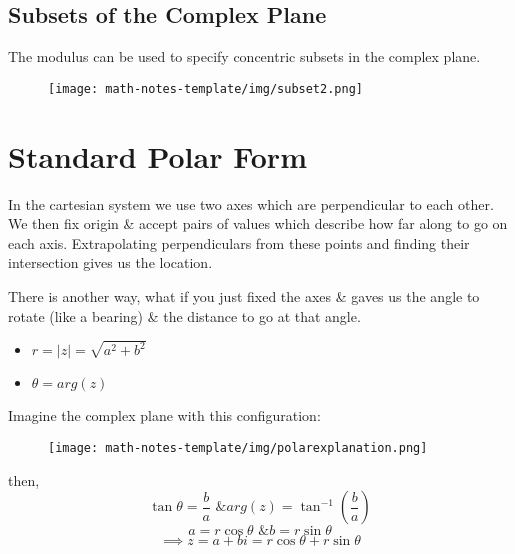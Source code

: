 \documentclass[oneside]{book}
\begin{document}



\subsection*{Subsets of the Complex Plane}

The modulus can be used to specify concentric subsets in the complex plane.


\begin{figure}[H]
    \centering
    \texttt{[image: math-notes-template/img/subset2.png]}
    \label{fig:enter-label}
\end{figure}

\section*{Standard Polar Form}
In the cartesian system we use two axes which are perpendicular to each other. We then fix origin \& accept pairs of values which describe how far along to go on each axis. Extrapolating perpendiculars from these points and finding their intersection gives us the location.\newline

There is another way, what if you just fixed the axes \& gaves us the angle to rotate (like a bearing) \& the distance to go at that angle.
\begin{itemize}
    \item $r = |z| = \sqrt{a^2 + b^2}$
    \item $\theta = arg(z)$
\end{itemize}
Imagine the complex plane with this configuration:
\begin{figure}[H]
    \centering
    \texttt{[image: math-notes-template/img/polarexplanation.png]}
    \label{fig:enter-label}
\end{figure}
then,
\[
\tan{\theta} = \frac{b}{a} \text{ \& } arg(z) = \tan^{-1}{\left(\frac{b}{a}\right)}
\]
\[
a = r\cos{\theta} \text{ \& } b = r\sin{\theta}
\]
\[
\implies z = a + bi = r\cos{\theta} + r\sin{\theta}
\]
\end{document}
